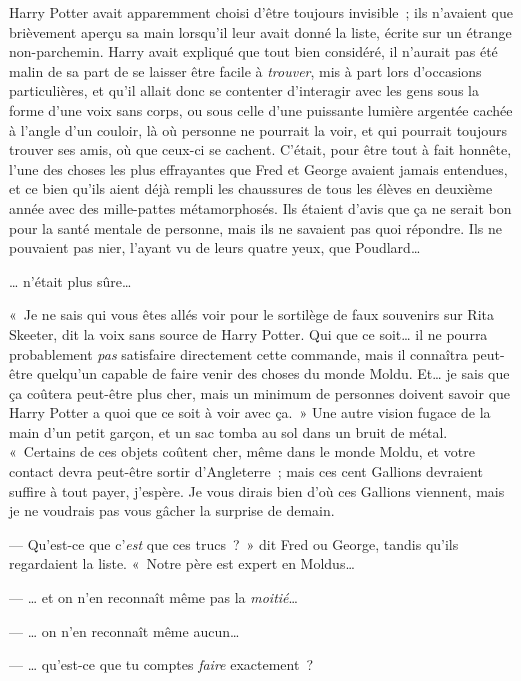 \later

Harry Potter avait apparemment choisi d'être toujours invisible~; ils n'avaient que brièvement aperçu sa main lorsqu'il leur avait donné la liste, écrite sur un étrange non-parchemin. Harry avait expliqué que tout bien considéré, il n'aurait pas été malin de sa part de se laisser être facile à \emph{trouver}, mis à part lors d'occasions particulières, et qu'il allait donc se contenter d'interagir avec les gens sous la forme d'une voix sans corps, ou sous celle d'une puissante lumière argentée cachée à l'angle d'un couloir, là où personne ne pourrait la voir, et qui pourrait toujours trouver ses amis, où que ceux-ci se cachent. C'était, pour être tout à fait honnête, l'une des choses les plus effrayantes que Fred et George avaient jamais entendues, et ce bien qu'ils aient déjà rempli les chaussures de tous les élèves en deuxième année avec des mille-pattes métamorphosés. Ils étaient d'avis que ça ne serait bon pour la santé mentale de personne, mais ils ne savaient pas quoi répondre. Ils ne pouvaient pas nier, l'ayant vu de leurs quatre yeux, que Poudlard…

… n'était plus sûre…

«~Je ne sais qui vous êtes allés voir pour le sortilège de faux souvenirs sur Rita Skeeter, dit la voix sans source de Harry Potter. Qui que ce soit… il ne pourra probablement \emph{pas} satisfaire directement cette commande, mais il connaîtra peut-être quelqu'un capable de faire venir des choses du monde Moldu. Et… je sais que ça coûtera peut-être plus cher, mais un minimum de personnes doivent savoir que Harry Potter a quoi que ce soit à voir avec ça.~» Une autre vision fugace de la main d'un petit garçon, et un sac tomba au sol dans un bruit de métal. «~Certains de ces objets coûtent cher, même dans le monde Moldu, et votre contact devra peut-être sortir d'Angleterre~; mais ces cent Gallions devraient suffire à tout payer, j'espère. Je vous dirais bien d'où ces Gallions viennent, mais je ne voudrais pas vous gâcher la surprise de demain.

--- Qu'est-ce que c'\emph{est} que ces trucs~?~» dit Fred ou George, tandis qu'ils regardaient la liste. «~Notre père est expert en Moldus…

--- … et on n'en reconnaît même pas la \emph{moitié}…

--- … on n'en reconnaît même aucun…

--- … qu'est-ce que tu comptes \emph{faire} exactement~?


